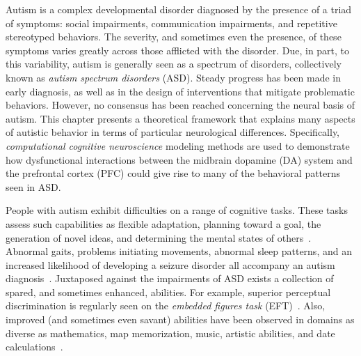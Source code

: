 % 
%
%

Autism is a complex developmental disorder diagnosed by the presence of a triad of symptoms: social impairments, communication impairments, and repetitive stereotyped behaviors. The severity, and sometimes even the presence, of these symptoms varies greatly across those afflicted with the disorder. Due, in part, to this variability, autism is generally seen as a spectrum of disorders, collectively known as \emph{autism spectrum disorders} (ASD). Steady progress has been made in early diagnosis, as well as in the design of interventions that mitigate problematic behaviors. However, no consensus has been reached concerning the neural basis of autism. This chapter presents a theoretical framework that explains many aspects of autistic behavior in terms of particular neurological differences.  Specifically, \emph{computational cognitive neuroscience} modeling methods are used to demonstrate how dysfunctional interactions between the midbrain dopamine (DA) system and the prefrontal cortex (PFC) could give rise to many of the behavioral patterns seen in ASD.

People with autism exhibit difficulties on a range of cognitive tasks. These tasks assess such capabilities as flexible adaptation, planning toward a goal, the generation of novel ideas, and determining the mental states of others~\cite{BennettoL:1996:AutismPlanningWCST,Ozonoff:1999:AutismStroopWCST,TurnerW:1999:AutismGenerativity,Baron-Cohen:1985:AutismTOM}. Abnormal gaits, problems initiating movements, abnormal sleep patterns, and an increased likelihood of developing a seizure disorder all accompany an autism diagnosis~\cite{RinehartNJ:2006:AutismGait,RinehartNJ:2001:AutismMovement,StoresG:1998:Sleep,TuchmanR:2002:EpilepsyAutism}. Juxtaposed against the impairments of ASD exists a collection of spared, and sometimes enhanced, abilities. For example, superior perceptual discrimination is regularly seen on the \emph{embedded figures task} (EFT)~\cite{ShahA:1983:Islet}. Also, improved (and sometimes even savant) abilities have been observed in domains as diverse as mathematics, map memorization, music, artistic abilities, and date calculations~\cite{PringL:1995:Savant,NelsonEC:1993:Calendar,HappeF:1999:WCC}.   

